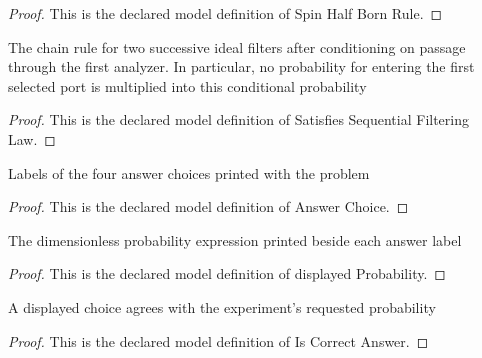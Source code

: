 \begin{proof}
  This is the declared model definition of Spin Half Born Rule.
\end{proof}
\begin{definition}
  \label{def:physics:phyx-mini-0542:phyxminiproblems-problemphyxmini0542-satisfiessequentialfilteringlaw}
  The chain rule for two successive ideal filters after conditioning on passage through the first analyzer. In particular, no probability for entering the first selected port is multiplied into this conditional probability
\end{definition}
\begin{proof}
  This is the declared model definition of Satisfies Sequential Filtering Law.
\end{proof}
\begin{definition}
  \label{def:physics:phyx-mini-0542:phyxminiproblems-problemphyxmini0542-answerchoice}
  Labels of the four answer choices printed with the problem
\end{definition}
\begin{proof}
  This is the declared model definition of Answer Choice.
\end{proof}
\begin{definition}
  \label{def:physics:phyx-mini-0542:phyxminiproblems-problemphyxmini0542-displayedprobability}
  The dimensionless probability expression printed beside each answer label
\end{definition}
\begin{proof}
  This is the declared model definition of displayed Probability.
\end{proof}
\begin{definition}
  \label{def:physics:phyx-mini-0542:phyxminiproblems-problemphyxmini0542-iscorrectanswer}
  A displayed choice agrees with the experiment's requested probability
\end{definition}
\begin{proof}
  This is the declared model definition of Is Correct Answer.
\end{proof}
